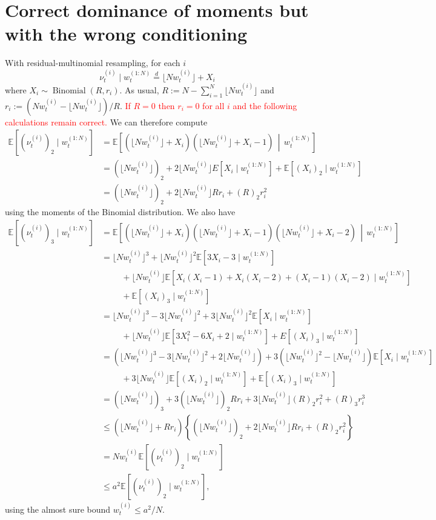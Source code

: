 \documentclass{article}
\newcommand{\eqdist}{\overset{d}{=}}
\newcommand{\E}{\mathbb{E}}
\newcommand{\1}[1]{\mathbbm{1}_{#1}}
\newcommand{\flnw}[1][i]{\lfloor N w_t^{(#1)} \rfloor}
\newcommand{\midd}{\,\middle|\,} %
\newcommand{\Bin}{\operatorname{Binomial}}
\newcommand{\seb}[1]{\xspace\textcolor{red}{#1}\xspace}
\begin{document}
\section{Correct dominance of moments but with the wrong conditioning}

With residual-multinomial resampling, for each $i$
\begin{equation*}
\nu_t^{(i)} \mid w_t^{(1:N)}
\eqdist \flnw + X_i
\end{equation*}
where $X_i \sim \Bin(R, r_i)$. As usual, $R := N - \sum_{i=1}^N \flnw$ and $r_i := ( Nw_t^{(i)} - \flnw ) /R$.
\seb{If $R=0$ then $r_i = 0$ for all $i$ and the following calculations remain correct.}
We can therefore compute
\begin{align*}
\E [ (\nu_t^{(i)})_2 \mid w_t^{(1:N)} ]
&= \E\left[ (\flnw + X_i) (\flnw + X_i -1) \midd w_t^{(1:N)} \right] \\
&= (\flnw)_2 + 2\flnw E[ X_i \mid w_t^{(1:N)} ] + \E[ (X_i)_2 \mid w_t^{(1:N)} ] \\
&= (\flnw)_2 + 2\flnw R r_i + (R)_2 r_i^2
\end{align*}
using the moments of the Binomial distribution.
We also have
\begin{align*}
\E [ (\nu_t^{(i)})_3 \mid w_t^{(1:N)} ]
&= \E\left[ (\flnw + X_i) (\flnw + X_i -1) (\flnw + X_i -2) \midd w_t^{(1:N)} \right] \\
&= \flnw^3 + \flnw^2 \E[ 3X_i -3 \mid w_t^{(1:N)} ] \\
    &\hspace{1cm}+ \flnw 
        \E[ X_i(X_i-1) + X_i(X_i-2) + (X_i-1)(X_i-2) \mid w_t^{(1:N)} ] \\
    &\hspace{1cm}+ \E[ (X_i)_3 \mid w_t^{(1:N)} ] \\
&= \flnw^3 - 3\flnw^2 +3\flnw^2 \E[ X_i \mid w_t^{(1:N)} ] \\
    &\hspace{1cm}+ \flnw \E[ 3X_i^2 - 6X_i +2 \mid w_t^{(1:N)} ] 
        + E[(X_i)_3 \mid w_t^{(1:N)} ]\\
&= \left( \flnw^3 - 3\flnw^2 + 2\flnw \right)
        + 3 \left( \flnw^2 - \flnw \right) \E[ X_i \mid w_t^{(1:N)} ] \\
    &\hspace{1cm}+ 3 \flnw \E[ (X_i)_2 \mid w_t^{(1:N)} ] 
        + \E[ (X_i)_3 \mid w_t^{(1:N)} ] \\
&= (\flnw)_3 + 3(\flnw)_2 R r_i + 3\flnw (R)_2 r_i^2 + (R)_3 r_i^3 \\
&\leq \left( \flnw + R r_i \right) \left\{ (\flnw)_2 + 2\flnw R r_i 
        + (R)_2 r_i^2 \right\} \\
&= Nw_t^{(i)} \E[(\nu_t^{(i)})_2 \mid w_t^{(1:N)} ] \\
&\leq a^2 \E[(\nu_t^{(i)})_2 \mid w_t^{(1:N)} ] ,
\end{align*}
using the almost sure bound $w_t^{(i)} \leq a^2/N$.
\end{document}
